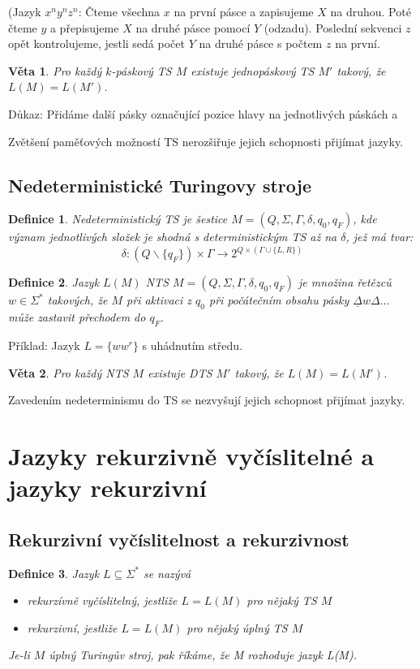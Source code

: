 \documentclass[a4paper, 11pt]{report}
\newtheorem{mydef}{Definice}[chapter]
\newtheorem{veta}{Věta}[chapter]
\begin{document}
(Jazyk $x^ny^nz^n$: Čteme všechna $x$ na první pásce a zapisujeme $X$ na druhou. Poté čteme $y$ a přepisujeme $X$ na druhé pásce pomocí $Y$ (odzadu). Poslední sekvenci $z$ opět kontrolujeme, jestli sedá počet $Y$ na druhé pásce s počtem $z$ na první.

\begin{veta}
Pro každý $k$-páskový TS $M$ existuje jednopáskový TS $M'$ takový, že $L(M) = L(M')$.
\end{veta}
Důkaz: Přidáme další pásky označující pozice hlavy na jednotlivých páskách a 

Zvětšení paměťových možností TS nerozšiřuje jejich schopnosti přijímat jazyky.

\subsection{Nedeterministické Turingovy stroje}

\begin{mydef}
Nedeterministický TS je šestice $M = (Q, \Sigma, \Gamma, \delta, q_0, q_F)$, kde význam jednotlivých složek je shodná s deterministickým TS až na $\delta$, jež má tvar:
$$\delta: (Q \backslash \{q_F\}) \times \Gamma \to 2^{Q \times (\Gamma \cup \{L,R\})}$$
\end{mydef}

\begin{mydef}
Jazyk $L(M)$ NTS $M = (Q, \Sigma, \Gamma, \delta, q_0, q_F)$ je množina řetězců $w \in \Sigma^*$ takových, že $M$ při aktivaci z $q_0$ při počátečním obsahu pásky $\underline{\Delta} w \Delta \dots$ může zastavit přechodem do $q_F$.
\end{mydef}

Příklad: Jazyk $L = \{ww^r\}$ s uhádnutím středu.

\begin{veta}
Pro každý NTS $M$ existuje DTS $M'$ takový, že $L(M) = L(M')$.
\end{veta}

Zavedením nedeterminismu do TS se nezvyšují jejich schopnost přijímat jazyky.

\section{Jazyky rekurzivně vyčíslitelné a jazyky rekurzivní}
\subsection{Rekurzivní vyčíslitelnost a rekurzivnost}
\begin{mydef}
Jazyk $L \subseteq \Sigma^*$ se nazývá
\begin{itemize}
	\item \emph{rekurzívně vyčíslitelný}, jestliže $L = L(M)$ pro nějaký TS $M$
	\item \emph{rekurzivní}, jestliže $L = L(M)$ pro nějaký úplný TS $M$
\end{itemize}
Je-li $M$ úplný Turingův stroj, pak říkáme, že M \emph{rozhoduje jazyk} L(M).
\end{mydef}
\end{document}
